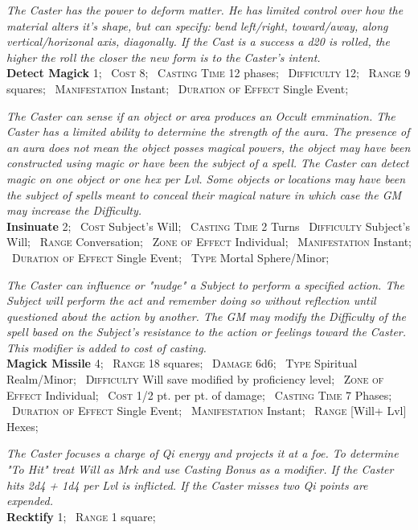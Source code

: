 \documentclass[11pt]{article}
\newcommand{\spell}[1]{{\sc\bfseries\large #1}}
\begin{document}
\noindent\textsl{The Caster has the power to deform matter. He has
  limited control over how the material alters it's shape, but can
  specify: bend left/right, toward/away, along vertical/horizonal
  axis, diagonally. If the Cast is a success a d20 is rolled, the
  higher the roll the closer the new form is to the Caster's intent.}
%
\\[6pt]
%
\spell{Detect Magick} 1;
\ \textsc{Cost}	8;
\ \textsc{Casting Time}	12 phases;
\ \textsc{Difficulty} 12;
\ \textsc{Range} 9 squares;
\ \textsc{Manifestation} Instant;
\ \textsc{Duration of Effect} Single Event;

\noindent\textsl{The Caster can sense if an object or area produces an Occult
  emmination. The Caster has a limited ability to determine the
  strength of the aura. The presence of an aura does not mean the
  object posses magical powers, the object may have been constructed
  using magic or have been the subject of a spell. The Caster can
  detect magic on one object or one hex per Lvl. Some objects or
  locations may have been the subject of spells meant to conceal their
  magical nature in which case the GM may increase the Difficulty.}
%
\\[6pt]
%
\spell{Insinuate} 2;
\ \textsc{Cost} Subject's Will;
\ \textsc{Casting Time} 2 Turns
\ \textsc{Difficulty} Subject's Will;
\ \textsc{Range} Conversation;
\ \textsc{Zone of Effect} Individual;
\ \textsc{Manifestation} Instant;
\ \textsc{Duration of Effect} Single Event;
\ \textsc{Type} Mortal Sphere/Minor;

\noindent\textsl{The Caster can influence or "nudge" a Subject to
  perform a specified action. The Subject will perform the act and
  remember doing so without reflection until questioned about the
  action by another. The GM may modify the Difficulty of the spell
  based on the Subject's resistance to the action or feelings toward
  the Caster. This modifier is added to cost of casting.}
%
\\[6pt]
%
\spell{Magick Missile} 4;
\ \textsc{Range} 18 squares;
\ \textsc{Damage} 6d6;
\ \textsc{Type} Spiritual Realm/Minor;
\ \textsc{Difficulty} Will save modified by proficiency level;
\ \textsc{Zone of Effect} Individual;
\ \textsc{Cost} 1/2 pt. per pt. of damage;
\ \textsc{Casting Time} 7 Phases;
\ \textsc{Duration of Effect} Single Event;
\ \textsc{Manifestation} Instant;
\ \textsc{Range} [Will+ Lvl] Hexes;

\noindent\textsl{The Caster focuses a charge of Qi energy and projects
  it at a foe. To determine "To Hit" treat Will as Mrk and use Casting
  Bonus as a modifier. If the Caster hits 2d4 + 1d4 per Lvl is
  inflicted. If the Caster misses two Qi points are expended.}
%
\\[6pt]
%
\spell{Recktify} 1;
\ \textsc{Range} 1 square;
\end{document}
